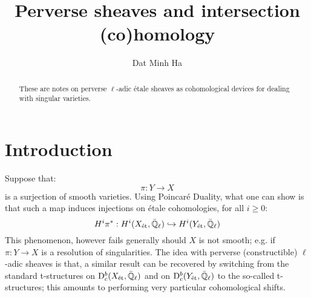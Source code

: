 

\setcounter{section}{-1}





    \title{Perverse sheaves and intersection (co)homology}
    
    \author{Dat Minh Ha}
    \maketitle
    
    \begin{abstract}
        These are notes on perverse $\ell$-adic \'etale sheaves as cohomological devices for dealing with singular varieties. 
    \end{abstract}
    
    {
      \hypersetup{} 
      \tableofcontents %
    }

    \section{Introduction}
        Suppose that:
            $$\pi: Y \to X$$
        is a surjection of smooth varieties. Using Poincar\'e Duality, what one can show is that such a map induces injections on \'etale cohomologies, for all $i \geq 0$:
            $$H^i\pi^*: H^i(X_{\mathrm{\acute{e}t}}, \bar{\mathbb{Q}}_{\ell}) \hookrightarrow H^i(Y_{\mathrm{\acute{e}t}}, \bar{\mathbb{Q}}_{\ell})$$
        This phenomenon, however fails generally should $X$ is not smooth; e.g. if $\pi: Y \to X$ is a resolution of singularities. The idea with perverse (constructible) $\ell$-adic sheaves is that, a similar result can be recovered by switching from the standard t-structures on $\mathrm{D}^b_c(X_{\mathrm{\acute{e}t}}, \bar{\mathbb{Q}}_{\ell})$ and on $\mathrm{D}^b_c(Y_{\mathrm{\acute{e}t}}, \bar{\mathbb{Q}}_{\ell})$ to the so-called  t-structures; this amounts to performing very particular cohomological shifts. 
    
    \printbibliography

